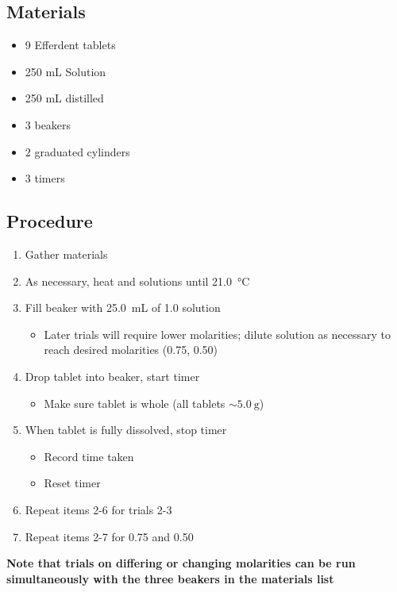 \documentclass[a4paper]{article}
\begin{document}
        \subsection{Materials}
            \begin{itemize}
                \item 9 Efferdent tablets
                \item 250 mL  Solution
                \item 250 mL distilled 
                \item 3 beakers
                \item 2 graduated cylinders
                \item 3 timers
            \end{itemize}
        \subsection{Procedure}
            \begin{enumerate}
                \item Gather materials
                \item As necessary, heat  and  solutions until \SI{21.0}{\celsius}
                \item Fill beaker with \SI{25.0}{\mL} of \SI{1.0}{\Molar}  solution
                \begin{itemize}
                    \item Later trials will require lower molarities; dilute solution
                        as necessary to reach desired molarities (\SI{0.75}{\Molar},
                        \SI{0.50}{\Molar})
                \end{itemize}
                \item Drop tablet into beaker, start timer
                \begin{itemize}
                    \item Make sure tablet is whole (all tablets \(\sim\SI{5.0}{\g}\))
                \end{itemize}
                \item When tablet is fully dissolved, stop timer
                \begin{itemize}
                    \item Record time taken
                    \item Reset timer
                \end{itemize}
                \item Repeat items 2-6 for trials 2-3
                \item Repeat items 2-7 for \SI{0.75}{\Molar} and \SI{0.50}{\Molar}
            \end{enumerate}
            \textbf{Note that trials on differing or changing molarities can be run simultaneously
                with the three beakers in the materials list}
\end{document}
